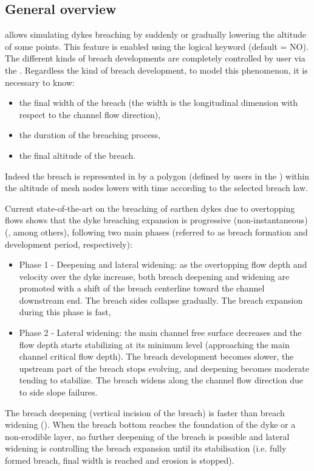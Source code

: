 \subsection{General overview}
 allows simulating dykes breaching by suddenly or gradually
lowering the altitude of some points.
This feature is enabled using the logical keyword  (default = NO).
The different kinds of breach developments are completely controlled by user
via the .
Regardless the kind of breach development, to model this phenomenon,
it is necessary to know:
\begin{itemize}
\item the final width of the breach (the width is the longitudinal dimension
with respect to the channel flow direction),
\item the duration of the breaching process,
\item the final altitude of the breach.
\end{itemize}
Indeed the breach is represented in  by a polygon (defined by users
in the ) within the altitude of mesh nodes lowers
with time according to the selected breach law.

Current state-of-the-art on the breaching of earthen dykes due to overtopping flows
shows that the dyke breaching expansion is progressive (non-instantaneous)
(\cite{Morris2009a,Risher2016,Wu2017,Rifai2017,Rifai2018,Rifai2019}, among
others), following two main phases (referred to as breach formation
and development period, respectively):
\begin{itemize}
\item Phase 1 - Deepening and lateral widening: as the overtopping flow depth and
velocity over the dyke increase, both breach deepening and widening are promoted
with a shift of the breach centerline toward the channel downstream end.
The breach sides collapse gradually. The breach expansion during this phase is fast,
\item Phase 2 - Lateral widening: the main channel free surface decreases and the
flow depth starts stabilizing at its minimum level (approaching the main channel
critical flow depth). The breach development becomes slower, the upstream part of
the breach stops evolving, and deepening becomes moderate tending to stabilize.
The breach widens along the channel flow direction due to side slope failures.
\end{itemize}
The breach deepening (vertical incision of the breach) is faster than breach widening
(\cite{Morris2009b,Wahl2017,Rifai2017,Rifai2018}). When the breach bottom
reaches the foundation of the dyke or a non-erodible layer, no further deepening of the
breach is possible and lateral widening is controlling the breach expansion until its
stabilisation (i.e. fully formed breach, final width is reached and erosion is stopped).

